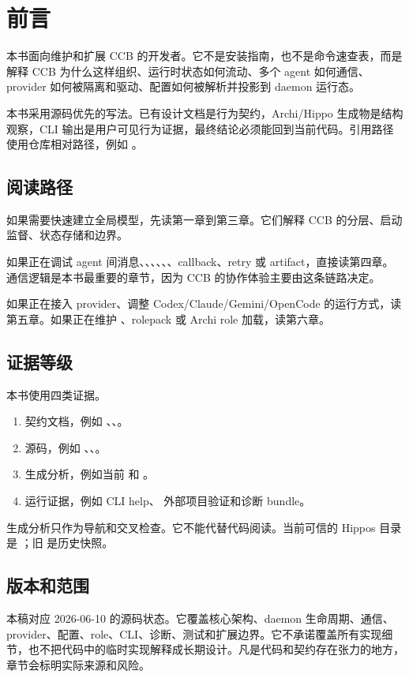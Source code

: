 \chapter{前言}

本书面向维护和扩展 CCB 的开发者。它不是安装指南，也不是命令速查表，而是解释 CCB 为什么这样组织、运行时状态如何流动、多个 agent 如何通信、provider 如何被隔离和驱动、配置如何被解析并投影到 daemon 运行态。

本书采用源码优先的写法。已有设计文档是行为契约，Archi/Hippo 生成物是结构观察，CLI 输出是用户可见行为证据，最终结论必须能回到当前代码。引用路径使用仓库相对路径，例如 。

\section{阅读路径}

如果需要快速建立全局模型，先读第一章到第三章。它们解释 CCB 的分层、启动监督、状态存储和边界。

如果正在调试 agent 间消息、、、、、、callback、retry 或 artifact，直接读第四章。通信逻辑是本书最重要的章节，因为 CCB 的协作体验主要由这条链路决定。

如果正在接入 provider、调整 Codex/Claude/Gemini/OpenCode 的运行方式，读第五章。如果正在维护 、rolepack 或 Archi role 加载，读第六章。

\section{证据等级}

本书使用四类证据。

\begin{enumerate}
  \item 契约文档，例如 、、。
  \item 源码，例如 、、。
  \item 生成分析，例如当前  和 。
  \item 运行证据，例如 CLI help、 外部项目验证和诊断 bundle。
\end{enumerate}

生成分析只作为导航和交叉检查。它不能代替代码阅读。当前可信的 Hippos 目录是 ；旧  是历史快照。

\section{版本和范围}

本稿对应 2026-06-10 的源码状态。它覆盖核心架构、daemon 生命周期、通信、provider、配置、role、CLI、诊断、测试和扩展边界。它不承诺覆盖所有实现细节，也不把代码中的临时实现解释成长期设计。凡是代码和契约存在张力的地方，章节会标明实际来源和风险。
